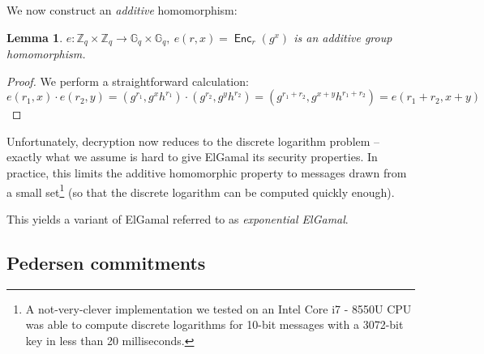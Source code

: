 \documentclass[11pt,twoside,a4paper]{article}
\DeclareMathOperator{\Enc}{\mathsf{Enc}}
\newtheorem{lemma}[theorem]{Lemma}
\theoremstyle{definition}
\begin{document}
We now construct an \textit{additive} homomorphism:
\begin{lemma}
    \(e:\mathbb{Z}_q\times\mathbb{Z}_q\rightarrow\mathbb{G}_q\times\mathbb{G}_q,\ e(r, x)=\Enc_r(g^x)\) is an additive group homomorphism.
\end{lemma}
\begin{proof}
    We perform a straightforward calculation:
    \[e(r_1, x)\cdot e(r_2,y)=(g^{r_1},g^xh^{r_1})\cdot(g^{r_2},g^yh^{r_2})=(g^{r_1+r_2},g^{x+y}h^{r_1+r_2})=e(r_1+r_2, x+y)\]
\end{proof}
Unfortunately, decryption now reduces to the discrete logarithm problem -- exactly what we assume is hard to give ElGamal its security properties. In practice, this limits the additive homomorphic property to messages drawn from a small set\footnote{A not-very-clever implementation we tested on an Intel Core i7 - 8550U CPU was able to compute discrete logarithms for 10-bit messages with a 3072-bit key in less than 20 milliseconds.} (so that the discrete logarithm can be computed quickly enough).

This yields a variant of ElGamal referred to as \textit{exponential ElGamal}.
\subsection{Pedersen commitments}
\end{document}
